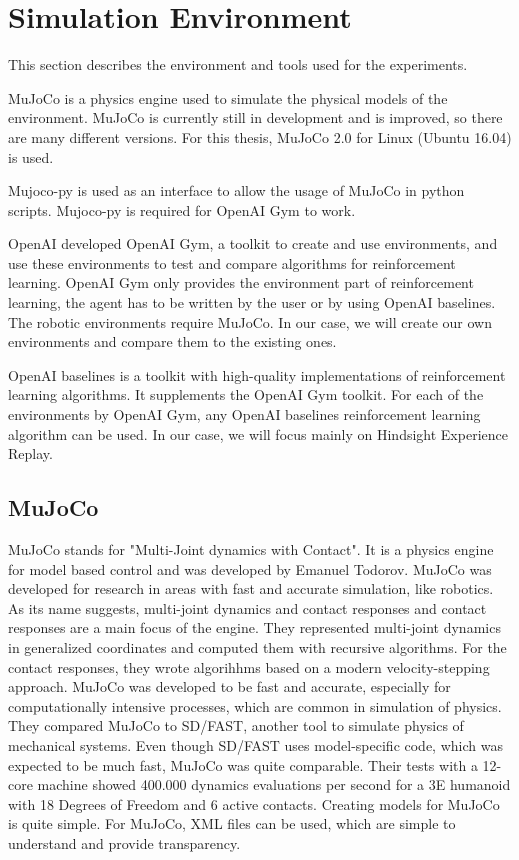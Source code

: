 \chapter{Simulation Environment}

This section describes the environment and tools used for the experiments.

MuJoCo is a physics engine used to simulate the physical models of the environment. MuJoCo is currently still in development and is improved, so there are many different versions. For this thesis, MuJoCo 2.0 for Linux (Ubuntu 16.04) is used. 

Mujoco-py is used as an interface to allow the usage of MuJoCo in python scripts. Mujoco-py is required for OpenAI Gym to work.

OpenAI developed OpenAI Gym, a toolkit to create and use environments, and use these environments to test and compare algorithms for reinforcement learning. OpenAI Gym only provides the environment part of reinforcement learning, the agent has to be written by the user or by using OpenAI baselines. The robotic environments require MuJoCo. In our case, we will create our own environments and compare them to the existing ones.

OpenAI baselines is a toolkit with high-quality implementations of reinforcement learning algorithms. It supplements the OpenAI Gym toolkit. For each of the environments by OpenAI Gym, any OpenAI baselines reinforcement learning algorithm can be used. In our case, we will focus mainly on Hindsight Experience Replay.



\section{MuJoCo}

MuJoCo stands for "Multi-Joint dynamics with Contact". It is a physics engine for model based control and was developed by Emanuel Todorov.
MuJoCo was developed for research in areas with fast and accurate simulation, like robotics. As its name suggests, multi-joint dynamics and contact responses and contact responses are a main focus of the engine. They represented multi-joint dynamics in generalized coordinates and computed them with recursive algorithms. For the contact responses, they wrote algorihhms based on a modern velocity-stepping approach. MuJoCo was developed to be fast and accurate, especially for computationally intensive processes, which are common in simulation of physics. They compared MuJoCo to SD/FAST, another tool to simulate physics of mechanical systems. Even though SD/FAST uses model-specific code, which was expected to be much fast, MuJoCo was quite comparable. Their tests with a 12-core machine showed 400.000 dynamics evaluations per second for a 3E humanoid with 18 Degrees of Freedom and 6 active contacts. 
Creating models for MuJoCo is quite simple. For MuJoCo, XML files can be used, which are simple to understand and provide transparency. 

